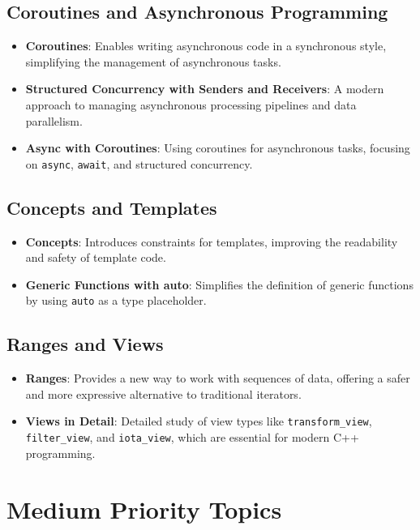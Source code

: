 \documentclass{article}
\begin{document}
\subsection*{Coroutines and Asynchronous Programming}
\begin{itemize}
    \item \textbf{Coroutines}:
    Enables writing asynchronous code in a synchronous style, simplifying the management of asynchronous tasks.

    \item \textbf{Structured Concurrency with Senders and Receivers}:
    A modern approach to managing asynchronous processing pipelines and data parallelism.

    \item \textbf{Async with Coroutines}:
    Using coroutines for asynchronous tasks, focusing on \texttt{async}, \texttt{await}, and structured concurrency.
\end{itemize}

\subsection*{Concepts and Templates}
\begin{itemize}
    \item \textbf{Concepts}:
    Introduces constraints for templates, improving the readability and safety of template code.

    \item \textbf{Generic Functions with auto}:
    Simplifies the definition of generic functions by using \texttt{auto} as a type placeholder.
\end{itemize}

\subsection*{Ranges and Views}
\begin{itemize}
    \item \textbf{Ranges}:
    Provides a new way to work with sequences of data, offering a safer and more expressive alternative to traditional iterators.

    \item \textbf{Views in Detail}:
    Detailed study of view types like \texttt{transform\_view}, \texttt{filter\_view}, and \texttt{iota\_view}, which are essential for modern C++ programming.
\end{itemize}

\section*{Medium Priority Topics}
\end{document}
